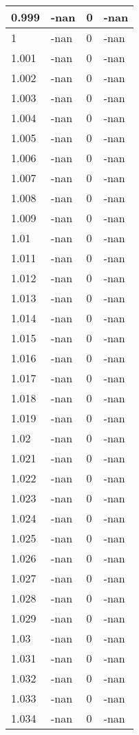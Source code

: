 \documentclass[a4paper,14pt]{extarticle}
\begin{document}
\begin{longtable}{||m{3cm}||m{3cm}|m{3cm}||m{3cm}||}
\hline
0.999 & -nan & 0 & -nan\\
\hline
1 & -nan & 0 & -nan\\
\hline
1.001 & -nan & 0 & -nan\\
\hline
1.002 & -nan & 0 & -nan\\
\hline
1.003 & -nan & 0 & -nan\\
\hline
1.004 & -nan & 0 & -nan\\
\hline
1.005 & -nan & 0 & -nan\\
\hline
1.006 & -nan & 0 & -nan\\
\hline
1.007 & -nan & 0 & -nan\\
\hline
1.008 & -nan & 0 & -nan\\
\hline
1.009 & -nan & 0 & -nan\\
\hline
1.01 & -nan & 0 & -nan\\
\hline
1.011 & -nan & 0 & -nan\\
\hline
1.012 & -nan & 0 & -nan\\
\hline
1.013 & -nan & 0 & -nan\\
\hline
1.014 & -nan & 0 & -nan\\
\hline
1.015 & -nan & 0 & -nan\\
\hline
1.016 & -nan & 0 & -nan\\
\hline
1.017 & -nan & 0 & -nan\\
\hline
1.018 & -nan & 0 & -nan\\
\hline
1.019 & -nan & 0 & -nan\\
\hline
1.02 & -nan & 0 & -nan\\
\hline
1.021 & -nan & 0 & -nan\\
\hline
1.022 & -nan & 0 & -nan\\
\hline
1.023 & -nan & 0 & -nan\\
\hline
1.024 & -nan & 0 & -nan\\
\hline
1.025 & -nan & 0 & -nan\\
\hline
1.026 & -nan & 0 & -nan\\
\hline
1.027 & -nan & 0 & -nan\\
\hline
1.028 & -nan & 0 & -nan\\
\hline
1.029 & -nan & 0 & -nan\\
\hline
1.03 & -nan & 0 & -nan\\
\hline
1.031 & -nan & 0 & -nan\\
\hline
1.032 & -nan & 0 & -nan\\
\hline
1.033 & -nan & 0 & -nan\\
\hline
1.034 & -nan & 0 & -nan\\

\end{longtable}
\end{document}
